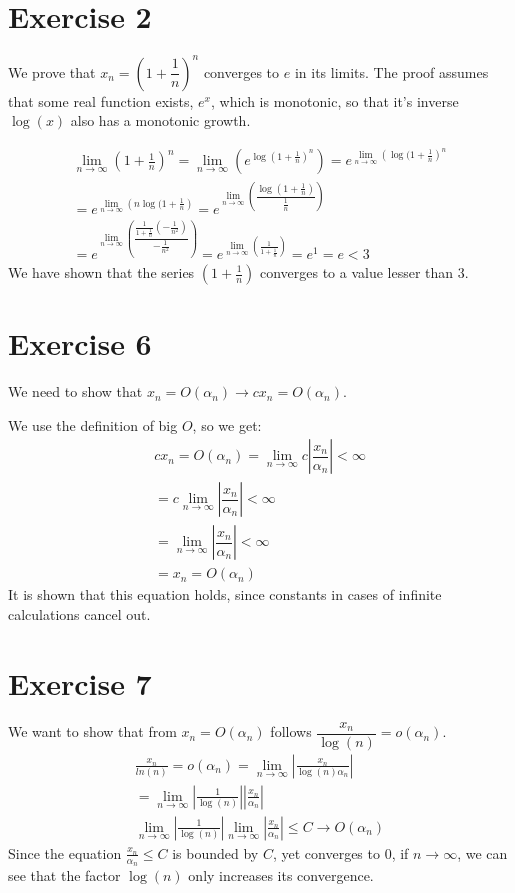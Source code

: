\section{Exercise 2}
We prove that $x_n = ( 1 + \dfrac{1}{n} ) ^n$ converges to $e$ in its limits.
The proof assumes that some real function exists, $e^x$, which is monotonic, so that it's inverse $\log(x)$ also has a monotonic growth.

\begin{gather*}
\lim_{n \to \infty} \left( 1 + \frac{1}{n} \right)^n = \lim_{n \to \infty} \left( e^{\log(1 + \frac{1}{n} )^n} \right) = e^{ \lim_{n \to \infty} \left( \log(1+\frac{1}{n} \right)^n } \\
=  e^{ \lim_{n \to \infty} \left( n \log(1+\frac{1}{n} \right)} = e^{ \lim_{n \to \infty} \left( \dfrac{\log \left( 1 + \frac{1}{n} \right)}{\frac{1}{n}} \right) }  \\
= e^{ \lim_{n \to \infty} \left( \dfrac{\frac{1}{1+\frac{1}{n}} \left( - \frac{1}{n^2} \right)}{ -\frac{1}{n^2}} \right) } = e^{ \lim_{n \to \infty} \left( \frac{1}{1+\frac{1}{n}} \right) } = e^1 = e < 3
\end{gather*}
We have shown that the series $(1+\frac{1}{n})$ converges to a value lesser than $3$.

\section{Exercise 6}
We need to show that $ x_n = O(\alpha_n)  \rightarrow c x_n = O (\alpha_n)$.

We use the definition of big $O$, so we get:
\begin{gather*}
c x_n = O (\alpha_n) = \lim\limits_{n \to \infty} c \left| \dfrac{x_n}{\alpha_n}\right| < \infty\\ 
= c \lim\limits_{n \to \infty} \left| \dfrac{x_n}{\alpha_n} \right| < \infty \\
= \lim\limits_{n \to \infty} \left| \dfrac{x_n}{\alpha_n} \right| < \infty \\
= x_n = O(\alpha_n)
\end{gather*}
It is shown that this equation holds, since constants in cases of infinite calculations cancel out.
\section{Exercise 7}
We want to show that from $x_n = O(\alpha_n)$ follows $\dfrac{x_n}{\log(n)} = o(\alpha_n)$.
\begin{gather*}
\frac{x_n}{ln(n)} = o(\alpha_n) = \lim_{n \to \infty} \left| \frac{x_n}{\log(n) \alpha_n} \right| \\
=  \lim_{n \to \infty} \left| \frac{1}{\log(n) } \right| \left| \frac{x_n}{\alpha_n} \right| \\
\lim_{n \to \infty} \left| \frac{1}{\log(n) } \right| \lim_{n \to \infty } \left|\frac{x_n}{\alpha_n} \right| \leq C \rightarrow O(\alpha_n)
\end{gather*}
Since the equation $  \frac{x_n}{\alpha_n} \leq C $ is bounded by $C$, yet converges to 0, if $n \to \infty$, we can see that the factor $\log (n)$ only increases its convergence.
